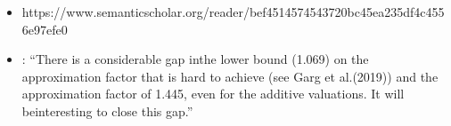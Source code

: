 \begin{itemize}
\begin{itemize}
		\item
		https://www.semanticscholar.org/reader/bef4514574543720bc45ea235df4c4556e97efe0

		\item
		\cite{fair_division_of_indiv_goods_for_a_class_of_concave_valuations}:
		\enquote{There is a considerable gap inthe lower bound (1.069) on the approximation factor that is hard to achieve (see Garg et al.(2019)) and the approximation factor of 1.445, even for the additive valuations.  It will beinteresting to close this gap.}
	\end{itemize}
\end{itemize}

